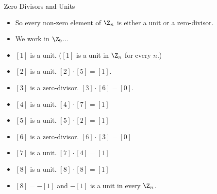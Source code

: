 \documentclass[handout]{beamer}
\begin{document}
\begin{frame}{Zero Divisors and Units}
\begin{itemize}
  \item So every non-zero element of $\Z_n$ is either a unit or a zero-divisor.
  \item We work in $\Z_9$...
  \item $[1]$ is a unit. ($[1]$ is a unit in $\Z_n$ for every $n$.)
  \item $[2]$ is a unit. $[2]\cdot [5] = [1]$.
  \item $[3]$ is a zero-divisor. $[3]\cdot[6] = [0]$.
  \item $[4]$ is a unit. $[4]\cdot [7] = [1]$
  \item $[5]$ is a unit. $[5]\cdot [2] = [1]$
  \item $[6]$ is a zero-divisor. $[6]\cdot [3] = [0]$
  \item $[7]$ is a unit. $[7]\cdot [4] = [1]$
  \item $[8]$ is a unit. $[8]\cdot [8] = [1]$
  \item $[8] = -[1]$ and $-[1]$ is a unit in every $\Z_n$.
\end{itemize}
\end{frame}
\end{document}
